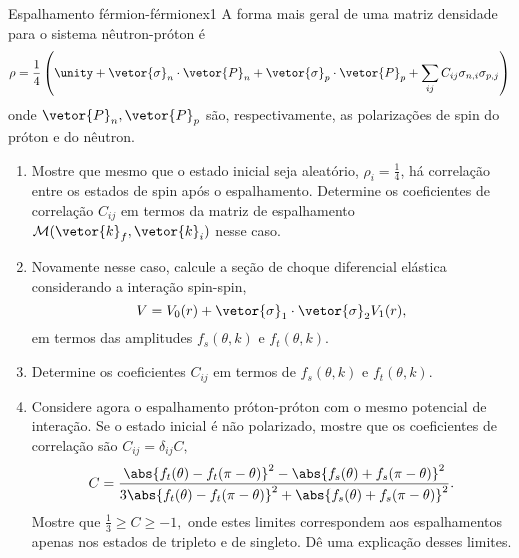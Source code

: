 \begin{exercício}{Espalhamento férmion-férmion}{ex1}
   A forma mais geral de uma matriz densidade para o sistema nêutron-próton é
   \begin{equation*}
      \rho = \frac14 \left(\unity + \vetor{\sigma}_n \cdot \vetor{P}_n + \vetor{\sigma}_p \cdot \vetor{P}_p + \sum_{ij}C_{ij}{\sigma_{n,i}\sigma_{p,j}}\right)
   \end{equation*}
   onde \(\vetor{P}_n,\vetor{P}_p\) são, respectivamente, as polarizações de spin do próton e do nêutron.
   \begin{enumerate}[label=(\alph*)]
      \item Mostre que mesmo que o estado inicial seja aleatório, \(\rho_i = \frac14\), há correlação entre os estados de spin após o espalhamento. Determine os coeficientes de correlação \(C_{ij}\) em termos da matriz de espalhamento \(\mathcal{M}(\vetor{k}_f,\vetor{k}_i)\) nesse caso.
      \item Novamente nesse caso, calcule a seção de choque diferencial elástica considerando a interação spin-spin,
         \begin{equation*}
            V = V_0(r) + \vetor{\sigma}_1 \cdot \vetor{\sigma}_2 V_1(r),
         \end{equation*}
         em termos das amplitudes \(f_{s}(\theta, k)\) e \(f_t(\theta,k).\)
      \item Determine os coeficientes \(C_{ij}\) em termos de \(f_s(\theta,k)\) e \(f_t(\theta,k).\)
      \item Considere agora o espalhamento próton-próton com o mesmo potencial de interação. Se o estado inicial é não polarizado, mostre que os coeficientes de correlação são \(C_{ij} = \delta_{ij} C,\)
         \begin{equation*}
            C = \frac{\abs{f_t(\theta) - f_t(\pi - \theta)}^2 - \abs{f_s(\theta) + f_s(\pi - \theta)}^2}{3 \abs{f_t(\theta) - f_t(\pi - \theta)}^2 + \abs{f_s(\theta) + f_s(\pi - \theta)}^2}.
         \end{equation*}
         Mostre que \(\frac13 \geq C \geq -1,\) onde estes limites correspondem aos espalhamentos apenas nos estados de tripleto e de singleto. Dê uma explicação desses limites.
   \end{enumerate}
\end{exercício}
